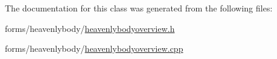 \-The documentation for this class was generated from the following files\-:\begin{DoxyCompactItemize}
\item 
forms/heavenlybody/\hyperlink{heavenlybodyoverview_8h}{heavenlybodyoverview.\-h}\item 
forms/heavenlybody/\hyperlink{heavenlybodyoverview_8cpp}{heavenlybodyoverview.\-cpp}\end{DoxyCompactItemize}
